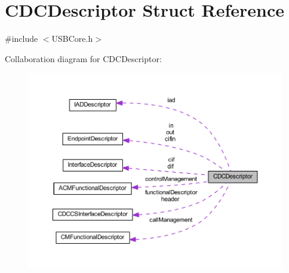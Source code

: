 \hypertarget{struct_c_d_c_descriptor}{}\section{C\+D\+C\+Descriptor Struct Reference}
\label{struct_c_d_c_descriptor}


{\ttfamily \#include $<$U\+S\+B\+Core.\+h$>$}



Collaboration diagram for C\+D\+C\+Descriptor\+:\nopagebreak
\begin{figure}[H]
\begin{center}
\leavevmode
\includegraphics[width=350pt]{struct_c_d_c_descriptor__coll__graph}
\end{center}
\end{figure}

